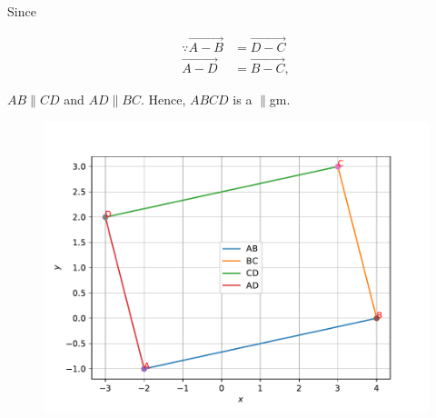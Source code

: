 Since 	

	\begin{align}
\because	\vec{A - B}&=\vec{D - C}
	\\
	\vec{A - D}&=\vec{B - C},
	\end{align}
	
	$AB \parallel CD$ and $AD \parallel BC$.  Hence, $ABCD$ is a $\parallel$gm.
	\begin{figure}[!ht]
	\centering
	\includegraphics[width=\columnwidth]{./solutions/1/4/q4.pdf}
	\caption{}
	\label{fig:2.2.5_qfour}	
	\end{figure}
